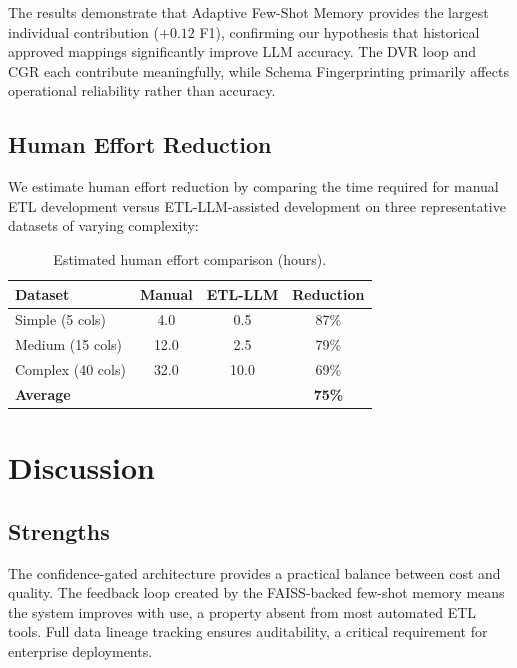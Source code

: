 \documentclass[conference]{IEEEtran}
\begin{document}
The results demonstrate that Adaptive Few-Shot Memory provides the largest
individual contribution ($+0.12$ F1), confirming our hypothesis that
historical approved mappings significantly improve LLM accuracy. The DVR loop
and CGR each contribute meaningfully, while Schema Fingerprinting primarily
affects operational reliability rather than accuracy.

\subsection{Human Effort Reduction}

We estimate human effort reduction by comparing the time required for manual
ETL development versus \textsc{ETL-LLM}-assisted development on three
representative datasets of varying complexity:

\begin{table}[t]
  \centering
  \caption{Estimated human effort comparison (hours).}
  \label{tab:effort}
  \begin{tabular}{lccc}
    \toprule
    \textbf{Dataset} & \textbf{Manual} & \textbf{ETL-LLM} & \textbf{Reduction} \\
    \midrule
    Simple (5 cols)   & 4.0  & 0.5  & 87\% \\
    Medium (15 cols)  & 12.0 & 2.5  & 79\% \\
    Complex (40 cols) & 32.0 & 10.0 & 69\% \\
    \midrule
    \textbf{Average}  &      &      & \textbf{75\%} \\
    \bottomrule
  \end{tabular}
\end{table}

\section{Discussion}
\label{sec:discussion}

\subsection{Strengths}

The confidence-gated architecture provides a practical balance between cost
and quality. The feedback loop created by the FAISS-backed few-shot memory
means the system improves with use, a property absent from most automated ETL
tools. Full data lineage tracking ensures auditability, a critical requirement
for enterprise deployments.
\end{document}
